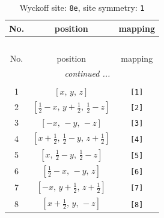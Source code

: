 \documentclass[fleqn,8pt]{jsarticle}
\begin{document}
\renewcommand{\arraystretch}{1.2}
\begin{longtable}{ccc}
\caption{Wyckoff site: {\tt 8e}, site symmetry: {\tt 1}}
 \\
 \hline \hline
No. & position & mapping \\ \hline \endfirsthead

\multicolumn{2}{l}{\tablename\ \thetable{}} \\
 \hline \hline
No. & position & mapping \\ \hline \endhead

 \hline \hline
\multicolumn{2}{r}{\footnotesize\it continued ...} \\ \endfoot

 \hline \hline
\multicolumn{2}{r}{} \\ \endlastfoot

1 & $\left[ x,\, y,\, z \right]$ & {\tt [1]} \\ \hline
2 & $\left[ \frac{1}{2} - x,\, y + \frac{1}{2},\, \frac{1}{2} - z \right]$ & {\tt [2]} \\ \hline
3 & $\left[ - x,\, - y,\, - z \right]$ & {\tt [3]} \\ \hline
4 & $\left[ x + \frac{1}{2},\, \frac{1}{2} - y,\, z + \frac{1}{2} \right]$ & {\tt [4]} \\ \hline
5 & $\left[ x,\, \frac{1}{2} - y,\, \frac{1}{2} - z \right]$ & {\tt [5]} \\ \hline
6 & $\left[ \frac{1}{2} - x,\, - y,\, z \right]$ & {\tt [6]} \\ \hline
7 & $\left[ - x,\, y + \frac{1}{2},\, z + \frac{1}{2} \right]$ & {\tt [7]} \\ \hline
8 & $\left[ x + \frac{1}{2},\, y,\, - z \right]$ & {\tt [8]} \\
\end{longtable}
\end{document}
